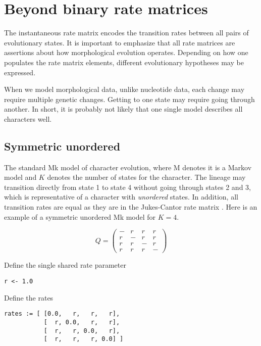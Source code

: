 \section{Beyond binary rate matrices} \label{sec:dm_matrix}

The instantaneous rate matrix encodes the transition rates between all pairs of evolutionary states.
It is important to emphasize that all rate matrices are assertions about how morphological evolution operates.
Depending on how one populates the rate matrix elements, different evolutionary hypotheses may be expressed. \par

When we model morphological data, unlike nucleotide data, each change may require multiple genetic changes.
Getting to one state may require going through another.
In short, it is probably not likely that one single model describes all characters well. \par 


\subsection{Symmetric unordered}

The standard Mk model of character evolution, where M denotes it is a Markov model and $K$ denotes the number of states for the character.
The lineage may transition directly from state 1 to state 4 without going through states 2 and 3, which is representative of a character with {\it unordered} states.
In addition, all transition rates are equal as they are in the Jukes-Cantor rate matrix \citep{jukes69}.
Here is an example of a symmetric unordered Mk model for $K=4$.

\begin{equation*}
Q = \begin{pmatrix}
- & r & r & r \\
r & - & r & r \\
r & r & - & r \\
r & r & r & - 
\end{pmatrix}
\end{equation*}


Define the single shared rate parameter
{\tt \begin{snugshade*}
\begin{lstlisting}
r <- 1.0
\end{lstlisting}
\end{snugshade*}}

Define the rates
{\tt \begin{snugshade*}
\begin{lstlisting}
rates := [ [0.0,   r,   r,   r],
           [  r, 0.0,   r,   r],
           [  r,   r, 0.0,   r],
           [  r,   r,   r, 0.0] ]
\end{lstlisting}
\end{snugshade*}}

